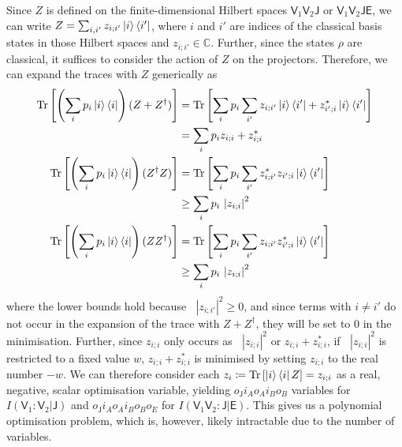 \documentclass[10pt, a4paper]{article}
\numberwithin{equation}{section} %
\theoremstyle{definition}
\theoremstyle{plain}
\newcommand{\abs}[1]{\mathop{}\left\lvert#1\right\rvert}
\newcommand{\?}{\mathrel{?}} %
\newcommand{\C}{\mathbb{C}} %
\newcommand{\Tr}[2][]{\mathop{\mathrm{Tr}#1}\left[ #2 \right]} %
\newcommand{\crv}[1]{\mathsf{#1}}
\begin{document}
\begin{appendices}
                          Since \(Z\) is defined on the finite-dimensional Hilbert spaces \(\crv{V}_1\crv{V}_2\crv{J}\) or \(\crv{V}_1\crv{V}_2\crv{JE}\), we can write \(Z = \sum_{i,i'} z_{i;i'} \ket{i}\bra{i'}\), where \(i\) and \(i'\) are indices of the classical basis states in those Hilbert spaces and \(z_{i;i'} \in \C\). Further, since the states \(\rho\) are classical, it suffices to consider the action of \(Z\) on the projectors. Therefore, we can expand the traces with \(Z\) generically as
                          \begin{align}
                            \Tr{\left(\sum_i p_i \ket{i}\bra{i}\right) (Z + Z^{\dagger})} &= 
                            \Tr{ \sum_i p_i \sum_{i'} z_{i;i'} \ket{i}\bra{i'} + {z_{i';i}^*} \ket{i}\bra{i'} } \\
                                                                                          &= 
                                                                                          \sum_i p_i z_{i;i} + {z_{i;i}^*} \\
                            \Tr{\left(\sum_i p_i \ket{i}\bra{i}\right) (Z^{\dagger}Z)} &=
                            \Tr{ \sum_i p_i \sum_{i'} {z_{i;i'}^*} z_{i';i} \ket{i}\bra{i'} } \\
                                                                                       &\geq 
                                                                                       \sum_i p_i \abs{z_{i;i}}^2 \\
                            \Tr{\left(\sum_i p_i \ket{i}\bra{i}\right) (ZZ^{\dagger})} &= 
                            \Tr{ \sum_i p_i \sum_{i'} z_{i;i'} {z_{i';i}^*} \ket{i}\bra{i'} } \\
                                                                                       &\geq 
                                                                                       \sum_i p_i \abs{z_{i;i}}^2
                          \end{align}
                          where the lower bounds hold because \(\abs{z_{i;i'}}^2 \geq 0\), and since terms with \(i \neq i'\) do not occur in the expansion of the trace with \(Z + Z^{\dagger}\), they will be set to 0 in the minimisation. Further, since \(z_{i;i}\) only occurs as \(\abs{z_{i;i}}^2\) or \(z_{i;i} + {z_{i;i}^*}\), if \(\abs{z_{i;i}}^2\) is restricted to a fixed value \(w\), \(z_{i;i} + {z_{i;i}^*}\) is minimised by setting \(z_{i;i}\) to the real number \(-w\). We can therefore consider each \(z_i \coloneqq \Tr{\ket{i}\bra{i} Z} = z_{i;i}\) as a real, negative, scalar optimisation variable, yielding \(o_{\crv{J}} i_A o_A i_B o_B\) variables for \(I(\crv{V}_1 : \crv{V}_2|\crv{J})\) and \(o_{\crv{J}} i_A o_A i_B o_B o_E\) for \(I(\crv{V}_1\crv{V}_2 : \crv{J}|\crv{E})\). This gives us a polynomial optimisation problem, which is, however, likely intractable due to the number of variables.


\end{appendices}
\end{document}
